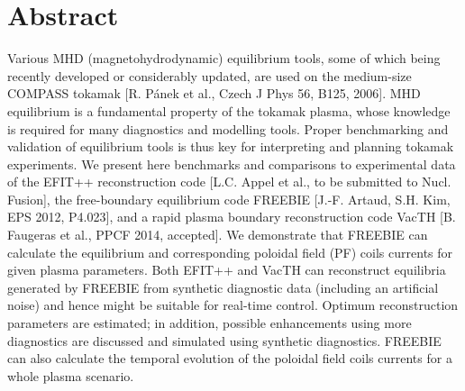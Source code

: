 \section{Abstract}

Various MHD (magnetohydrodynamic) equilibrium tools, some of which being recently developed or considerably updated, are used on the medium-size COMPASS tokamak [R. Pánek et al., Czech J Phys 56, B125, 2006]. MHD equilibrium is a fundamental property of the tokamak plasma, whose knowledge is required for many diagnostics and modelling tools. Proper benchmarking and validation of equilibrium tools is thus key for interpreting and planning tokamak experiments. We present here benchmarks and comparisons to experimental data of the EFIT++ reconstruction code [L.C. Appel et al., to be submitted to Nucl. Fusion], the free-boundary equilibrium code FREEBIE  [J.-F. Artaud, S.H. Kim, EPS 2012, P4.023], and a rapid plasma boundary reconstruction code VacTH [B. Faugeras et al., PPCF 2014, accepted]. We demonstrate that FREEBIE can calculate the equilibrium and corresponding poloidal field (PF) coils currents for given plasma parameters. Both EFIT++ and VacTH can reconstruct equilibria generated by FREEBIE from synthetic diagnostic data (including an artificial noise) and hence might be suitable for real-time control. Optimum reconstruction parameters are estimated; in addition, possible enhancements using more diagnostics are discussed and simulated using synthetic diagnostics. FREEBIE can also calculate the temporal evolution of the poloidal field coils currents for a whole plasma scenario.